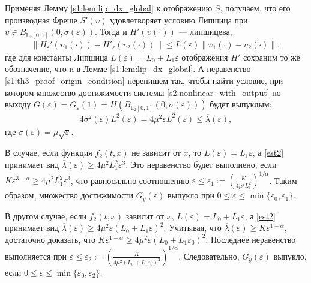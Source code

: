 \documentclass[../main.tex]{subfiles}
\begin{document}
 \doc
 Применяя Лемму \ref{s1:lem:lip_dx_global} к отображению $S$, получаем, что его производная Фреше $S'(\upsilon)$ удовлетворяет условию Липшица
 при $ \upsilon \in B_{\mathbb{L}_2[0,1]}(0,\sigma(\varepsilon)) $.
 Тогда и $ H'(\upsilon(\cdot)) $ --- липшицева, 
 \begin{gather*}
 \left\| H_{\varepsilon}'(\upsilon_1(\cdot)) - H'_{\varepsilon}(\upsilon_2(\cdot)) \right\| \leqslant L(\varepsilon) \left\| \upsilon_1(\cdot) - \upsilon_2(\cdot)\right\|,
 \end{gather*}
 где для константы Липшица $ L(\varepsilon) = L_0 + L_1 \varepsilon$ отображения $ H' $ сохраним то же обозначение, что и в Лемме \ref{s1:lem:lip_dx_global}.
 А неравенство \eqref{s1:th3_proof_origin_condition} перепишем так, чтобы найти условие, при котором множество достижимости системы \eqref{s2:nonlinear_with_output} по выходу $ \overline{G}(\varepsilon) = \overline{G}_{\varepsilon}(1) = H (B_{\mathbb{L}_2[0,1]}(0,\sigma(\varepsilon)))$ будет выпуклым:
 \begin{gather}\label{est2}
 4\sigma^2(\varepsilon)L^2(\varepsilon) = 4\mu^2\varepsilon L^2(\varepsilon) \leqslant \overline{\lambda}(\varepsilon),
 \end{gather}
 где $ \sigma(\varepsilon) = \mu\sqrt{\varepsilon} $.
 
 В случае, если функция $ f_2(t,x) $ не зависит от $ x $, то $ L(\varepsilon) = L_1 \varepsilon $, а \eqref{est2} принимает вид $ \overline{\lambda}(\varepsilon) \geqslant 4\mu^2L_1^2 \varepsilon^3 $. 
Это неравенство будет выполнено, если $ K\varepsilon^{3 - \alpha} \geqslant 4\mu^2L_1^2 \varepsilon^3 $, что равносильно соотношению $ \varepsilon \leqslant \varepsilon_1 := \left(\frac{K}{4\mu^2L_1^2}\right)^{1/\alpha} $. 
Таким образом, множество достижимости $ G_y(\varepsilon)$ выпукло при $ 0 \leqslant \varepsilon \leqslant \min\{\varepsilon_0,\varepsilon_1\} $. 
 
 В другом случае, если $ f_2(t,x) $ зависит от $ x $, $ L(\varepsilon) =L_0+L_1\varepsilon $, а \eqref{est2} принимает вид $ \overline{\lambda}(\varepsilon) \geqslant 4\mu^2 \varepsilon (L_0 + L_1 \varepsilon)^2 $. 
Учитывая, что $ \overline{\lambda}(\varepsilon) \geqslant K \varepsilon^{1-\alpha} $, достаточно доказать, что $ K \varepsilon^{1-\alpha} \geqslant 4\mu^2 \varepsilon (L_0 + L_1 \varepsilon_0)^2 $. 
Последнее неравенство выполняется при $ \varepsilon \leqslant \varepsilon_2 := \left(\frac{K}{4\mu^2(L_0 + L_1\varepsilon_0)^2} \right)^{1/\alpha} $. 
Следовательно, $ G_y(\varepsilon) $ выпукло, если $ 0 \leqslant \varepsilon \leqslant \min\{\varepsilon_0, \varepsilon_2\} $.
 
\end{document}
